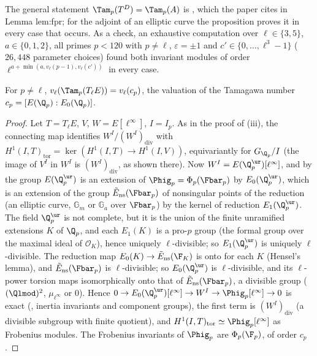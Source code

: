 The general statement $\Tam_p(T^D)=\Tam_p(A)$ is \cite[(57)]{DFG04}, which the paper cites in Lemma lem:fpr; for the adjoint of an elliptic curve the proposition proves
it in every case that occurs. As a check, an exhaustive computation over $\ell\in\{3,5\}$, $a\in\{0,1,2\}$, all primes $p<120$ with $p\ne\ell$, $\varepsilon=\pm1$ and
$c'\in\{0,\dots,\ell^3-1\}$ ($26{,}448$ parameter choices) found both invariant modules of order $\ell^{a+\min(a,v_\ell(p-1),v_\ell(c'))}$ in every case.

\begin{proposition}\label{prop:blochkato:tam-of-E}
For $p\ne\ell$, $v_\ell(\Tam_p(T_\ell E))=v_\ell(c_p)$, the valuation of the Tamagawa number $c_p=[E(\Q_p):E_0(\Q_p)]$.
\end{proposition}

\begin{proof}
Let $T=T_\ell E$, $V$, $W=E[\ell^\infty]$, $I=I_p$. As in the proof of (iii), the connecting map identifies $W^I/(W^I)_{\mathrm{div}}$ with
$H^1(I,T)_{\mathrm{tor}}=\ker(H^1(I,T)\to H^1(I,V))$, equivariantly for $G_{\Q_p}/I$ (the image of $V^I$ in $W^I$ is $(W^I)_{\mathrm{div}}$, as shown there). Now $W^I=E(\Q_p^{\ur})[\ell^\infty]$, and
by  the group $E(\Q_p^{\ur})$ is an extension of $\Phig_p=\Phi_p(\Fbar_p)$ by $E_0(\Q_p^{\ur})$, which is an extension of the group $\tilde E_{\mathrm{ns}}(\Fbar_p)$ of
nonsingular points of the reduction (an elliptic curve, $\mathbb G_m$ or $\mathbb G_a$ over $\Fbar_p$) by the kernel of reduction $E_1(\Q_p^{\ur})$. The field $\Q_p^{\ur}$ is not
complete, but it is the union of the finite unramified extensions $K$ of $\Q_p$, and each $E_1(K)$ is a pro-$p$ group (the formal group over the maximal ideal of
$\mathcal O_K$), hence uniquely $\ell$-divisible; so $E_1(\Q_p^{\ur})$ is uniquely $\ell$-divisible. The reduction map $E_0(K)\to\tilde E_{\mathrm{ns}}(\F_K)$ is onto for each $K$
(Hensel's lemma), and $\tilde E_{\mathrm{ns}}(\Fbar_p)$ is $\ell$-divisible; so $E_0(\Q_p^{\ur})$ is $\ell$-divisible, and its $\ell$-power torsion maps isomorphically onto that of
$\tilde E_{\mathrm{ns}}(\Fbar_p)$, a divisible group ($(\Qlmod)^2$, $\mu_{\ell^\infty}$ or $0$). Hence $0\to E_0(\Q_p^{\ur})[\ell^\infty]\to W^I\to\Phig_p[\ell^\infty]\to0$ is exact (, inertia invariants and component
groups), the first term is $(W^I)_{\mathrm{div}}$ (a divisible subgroup with finite quotient), and $H^1(I,T)_{\mathrm{tor}}\simeq\Phig_p[\ell^\infty]$ as Frobenius modules. The
Frobenius invariants of $\Phig_p$ are $\Phi_p(\F_p)$, of order $c_p$.
\end{proof}

